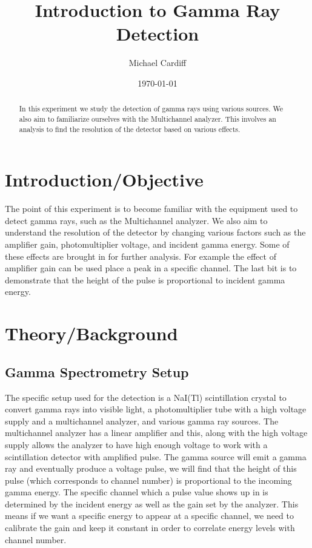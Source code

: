 \documentclass[letterpaper,12pt]{article}
\begin{document}
\title{Introduction to Gamma Ray Detection}
\author{Michael Cardiff}
\date{\today}
\maketitle

\begin{abstract}
  In this experiment we study the detection of gamma rays using various sources. We also aim to familiarize ourselves with the Multichannel analyzer. This involves an analysis to find the resolution of the detector based on various effects. 
\end{abstract}
\section{Introduction/Objective}
The point of this experiment is to become familiar with the equipment used to detect gamma rays, such as the Multichannel analyzer. We also aim to understand the resolution of the detector by changing various factors such as the amplifier gain, photomultiplier voltage, and incident gamma energy. Some of these effects are brought in for further analysis. For example the effect of amplifier gain can be used place a peak in a specific channel. The last bit is to demonstrate that the height of the pulse is proportional to incident gamma energy. 
\section{Theory/Background}

\subsection{Gamma Spectrometry Setup}
The specific setup used for the detection is a NaI(Tl) scintillation crystal to convert gamma rays into visible light, a photomultiplier tube with a high voltage supply and a multichannel analyzer, and various gamma ray sources. The multichannel analyzer has a linear amplifier and this, along with the high voltage supply allows the analyzer to have high enough voltage to work with a scintillation detector with amplified pulse. The gamma source will emit a gamma ray and eventually produce a voltage pulse, we will find that the height of this pulse (which corresponds to channel number) is proportional to the incoming gamma energy. The specific channel which a pulse value shows up in is determined by the incident energy as well as the gain set by the analyzer. This means if we want a specific energy to appear at a specific channel, we need to calibrate the gain and keep it constant in order to correlate energy levels with channel number. 
\end{document}

